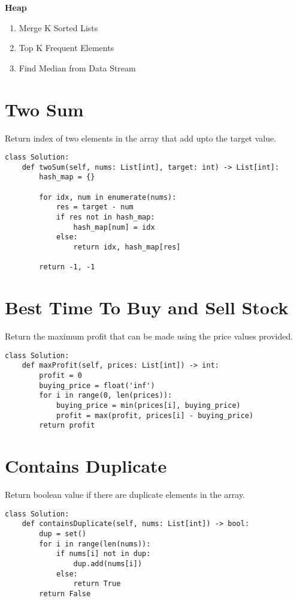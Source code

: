 \documentclass[24pt, a4]{article}
\begin{document}
\textbf{Heap}
\begin{enumerate}
	\item{Merge K Sorted Lists}
	\item{Top K Frequent Elements}
	\item{Find Median from Data Stream}
\end{enumerate}

\newpage
\section{Two Sum}
Return index of two elements in the array that add upto the target value.
\begin{lstlisting}
class Solution:
    def twoSum(self, nums: List[int], target: int) -> List[int]:
        hash_map = {}
        
        for idx, num in enumerate(nums):
            res = target - num
            if res not in hash_map:
                hash_map[num] = idx
            else:
                return idx, hash_map[res]
        
        return -1, -1
\end{lstlisting}

\section{Best Time To Buy and Sell Stock}
Return the maximum profit that can be made using the price values provided.
\begin{lstlisting}
class Solution:
    def maxProfit(self, prices: List[int]) -> int:
        profit = 0
        buying_price = float('inf')
        for i in range(0, len(prices)):
            buying_price = min(prices[i], buying_price)
            profit = max(profit, prices[i] - buying_price)
        return profit
\end{lstlisting}

\section{Contains Duplicate}
Return boolean value if there are duplicate elements in the array.
\begin{lstlisting}
class Solution:
    def containsDuplicate(self, nums: List[int]) -> bool:
        dup = set()
        for i in range(len(nums)):
            if nums[i] not in dup:
                dup.add(nums[i])
            else:
                return True
        return False
\end{lstlisting}
\end{document}
